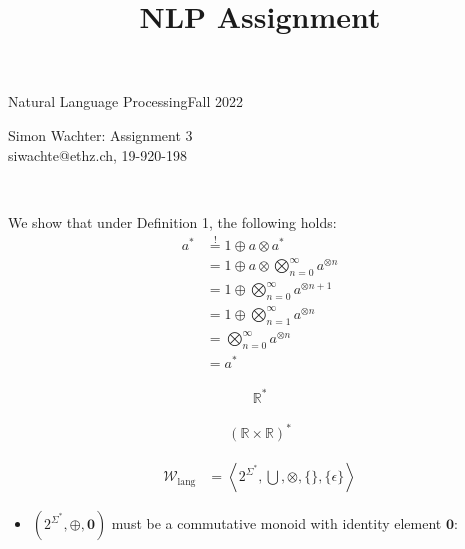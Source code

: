 \documentclass[a4paper,12pt]{ETHexercise}
\title{NLP Assignment}
\begin{document}


\newcommand{\pair}[2]{{\langle #1 , #2 \rangle}}
\newcommand{\score}[2]{\text{score}_{\theta}(\langle #1, #2 \rangle, \boldsymbol{w})}
\newcommand{\sscore}[1]{\text{score}_{\theta}(#1, \boldsymbol{w})}

{}
{\Large Natural Language Processing}{Fall 2022}
\begin{center}
	{\Huge Simon Wachter: Assignment 3}\\
	\quad\newline
	siwachte@ethz.ch, 19-920-198\\
	\quad\newline
	\timestamp
\end{center}
\begin{question}\\
	\begin{subquestion}
		We show that under Definition 1, the following holds:
		\begin{align}
			a^* & \overset{!}{=} 1 \oplus a \otimes a^*                        \\
			    & = 1 \oplus a \otimes \bigotimes_{n=0}^{\infty} a^{\otimes n} \\
			    & = 1 \oplus \bigotimes_{n=0}^{\infty} a^{\otimes n+1}         \\
			    & = 1 \oplus \bigotimes_{n=1}^{\infty} a^{\otimes n}           \\
			    & = \bigotimes_{n=0}^{\infty} a^{\otimes n}                    \\
			    & = a^*
		\end{align}
	\end{subquestion}
	\begin{subquestion}
		\begin{align}
			\mathbb{R}^*
		\end{align}
	\end{subquestion}
	\begin{subquestion}
		\begin{align}
			\left(\mathbb{R} \times \mathbb{R} \right)^*
		\end{align}
	\end{subquestion}
	\begin{subquestion}
		\begin{align}
			\mathcal{W}_{\text{lang}} & =\left\langle 2^{\Sigma^*}, \bigcup, \otimes, \{\}, \{\epsilon\} \right\rangle
		\end{align}
		\begin{itemize}
			\item  $(2^{\Sigma^*}, \oplus, \mathbf{0})$ must be a commutative monoid with identity element $\mathbf{0}$:

\end{itemize}
\end{subquestion}
\end{question}
\end{document}
